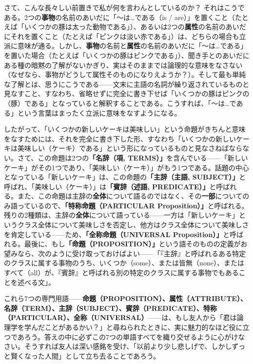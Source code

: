 \documentclass[a4paper,11pt,openany]{ltjsbook}
\begin{document}
さて、こんな長々しい前置きで私が何を言わんとしているのか？ それはこうである。2つの\textbf{事物}の名前のあいだに「〜は…である（is / are）」を置くこと（たとえば「いくつかの豚は太った動物である」）、あるいは2つの\textbf{属性}の名前のあいだにそれを置くこと（たとえば「ピンクは淡い赤である」）は、どちらの場合も立派に意味が通る。しかし、\textbf{事物}の名前と\textbf{属性}の名前のあいだに「〜は…である」を置いた場合（たとえば「いくつかの豚はピンクである」）、聞き手とのあいだにある種の暗黙の了解がないかぎり、実はそのままでは論理的な意味をなさない（なぜなら、事物がどうして属性そのものになりえようか？）。そして最も単純な了解とは、思うにこうである——文末に主語の名詞が繰り返されているものと見なすこと、すなわち、省略せずに完全に書き下せば「いくつかの豚はピンクの（豚）である」となっていると解釈することである。こうすれば、「〜は…である」という言葉はまったく立派に意味をなすようになる。

したがって、「いくつかの新しいケーキは美味しい」という命題がきちんと意味をなすためには、それを完全に書き下した形、すなわち「いくつかの新しいケーキは美味しい（ケーキ）である」という形になっているものと見なさねばならない。さて、この命題は2つの\textbf{「名辞（項, TERMS）」}を含んでいる——「新しいケーキ」がその1つであり、「美味しい（ケーキ）」がもう1つである。話題の中心となっている「新しいケーキ」は、この命題の\textbf{「主辞（主語, SUBJECT）」}と呼ばれ、「美味しい（ケーキ）」は\textbf{「賓辞（述語, PREDICATE）」}と呼ばれる。また、この命題は主辞の\textbf{全体}について語るのではなく、その\textbf{一部}についてのみ語っているので、\textbf{「特称命題（PARTICULAR Proposition）」}と呼ばれる。残りの2種類は、主辞の\textbf{全体}について語っている——一方は「新しいケーキ」というクラス全体について美味しさを否定し、他方はクラス全体について美味しさを肯定している——ため、\textbf{「全称命題（UNIVERSAL Proposition）」}と呼ばれる。最後に、もし\textbf{「命題（PROPOSITION）」}という語そのものの定義がお望みなら、次のように受け取っておけばよい——「『主辞』と呼ばれるある特定のクラスに属する事物のうち、いくつか（some）、または皆無（none）、またはすべて（all）が、『賓辞』と呼ばれる別の特定のクラスに属する事物でもあることを述べる文」。

これら7つの専門用語——\textbf{命題（PROPOSITION）、属性（ATTRIBUTE）、名辞（TERM）、主辞（SUBJECT）、賓辞（PREDICATE）、特称（PARTICULAR）、全称（UNIVERSAL）}——は、もし友人から「君は論理学を学んだことがあるかい？」と尋ねられたときに、実に魅力的なほど役に立つであろう。答えの中に必ずこの7つの単語すべてを織り交ぜるように心がけなさい。そうすれば友人は深い感銘を受け、「以前より少し悲しげで、しかしずっと賢くなった人間」として立ち去ることであろう。
\end{document}
